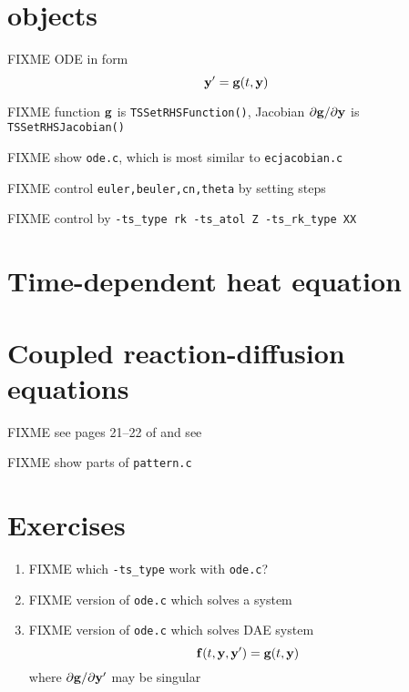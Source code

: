 
\section{\PETSc \pTS objects}

FIXME ODE in form
    $$\mathbf{y}' = \mathbf{g}(t,\mathbf{y})$$

FIXME function $\mathbf{g}$ is \texttt{TSSetRHSFunction()}, Jacobian $\partial \mathbf{g}/\partial \mathbf{y}$ is \texttt{TSSetRHSJacobian()}

FIXME show \texttt{ode.c}, which is most similar to \texttt{ecjacobian.c}

FIXME control \texttt{euler,beuler,cn,theta} by setting steps

FIXME control  by \texttt{-ts\_type rk -ts\_atol Z -ts\_rk\_type XX}

\section{Time-dependent heat equation}


\section{Coupled reaction-diffusion equations}

FIXME see pages 21--22 of \citep{HundsdorferVerwer2003} and see \citep{Pearson1993}

FIXME show parts of \texttt{pattern.c}


\section{Exercises}

\renewcommand{\labelenumi}{\arabic{chapter}.\arabic{enumi}\quad}
\renewcommand{\labelenumii}{(\alph{enumii})}
\begin{enumerate}
\item FIXME which \texttt{-ts\_type} work with \texttt{ode.c}?
\item FIXME version of \texttt{ode.c} which solves a system
\item FIXME version of \texttt{ode.c} which solves DAE system
    $$\mathbf{f}(t,\mathbf{y},\mathbf{y}') = \mathbf{g}(t,\mathbf{y})$$
where $\partial \mathbf{g}/\partial \mathbf{y}'$ may be singular
\end{enumerate}
